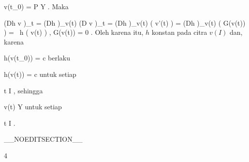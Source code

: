 {\mavergleichskette
{\vergleichskette
{ v(t_0)
}
{ = }{ P
}
{ \in }{ Y
}
{    }{
}
{   }{
}
}
{}{}{.}
Maka

\mavergleichskettealign
{\vergleichskettealign
{ \left(Dh \circ v \right)_{t}
}
{ =} { \left(Dh  \right)_{v(t)} \circ  \left(D v \right)_{t}
}
{ =} { \left(Dh  \right)_{v(t)}  \left(  v'(t)  \right)
}
{ =} { \left(Dh  \right)_{v(t)}  \left(  G(v(t))  \right)
}
{ =} { \left\langle
{} \,  h  ( v(t) )  ,  G(v(t))    \right\rangle
}
}
{
\vergleichskettefortsetzungalign
{ =} { 0
}
{ } {}
{ } {}
{ } {}
}
{}{.}
Oleh karena itu, $h$ konstan pada citra $v( I)$ dan, karena

\mavergleichskette
{\vergleichskette
{ h(v(t_0))
}
{ = }{ c
}
{  }{
}
{    }{
}
{   }{
}
}
{}{}{}
berlaku

\mavergleichskette
{\vergleichskette
{ h(v(t))
}
{ = }{ c
}
{  }{
}
{    }{
}
{   }{
}
}
{}{}{}
untuk setiap

\mavergleichskette
{\vergleichskette
{ t
}
{ \in }{ I
}
{  }{
}
{    }{
}
{   }{
}
}
{}{}{,}
sehingga

\mavergleichskette
{\vergleichskette
{ v(t)
}
{ \in }{ Y
}
{  }{
}
{    }{
}
{   }{
}
}
{}{}{}
untuk setiap

\mavergleichskette
{\vergleichskette
{ t
}
{ \in }{ I
}
{  }{
}
{    }{
}
{   }{
}
}
{}{}{.}

 }

__NOEDITSECTION__

{4}

